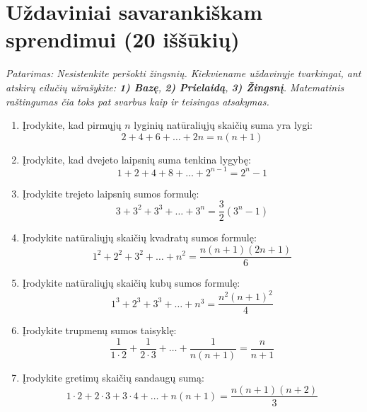 \documentclass[11pt,a4paper]{scrartcl}
\begin{document}
\section{Uždaviniai savarankiškam sprendimui (20 iššūkių)}

\textit{Patarimas: Nesistenkite peršokti žingsnių. Kiekviename uždavinyje tvarkingai, ant atskirų eilučių užrašykite: \textbf{1) Bazę}, \textbf{2) Prielaidą}, \textbf{3) Žingsnį}. Matematinis raštingumas čia toks pat svarbus kaip ir teisingas atsakymas.}

\begin{enumerate}
    \item Įrodykite, kad pirmųjų $n$ lyginių natūraliųjų skaičių suma yra lygi:
    $$ 2 + 4 + 6 + \dots + 2n = n(n+1) $$
    
    \item Įrodykite, kad dvejeto laipsnių suma tenkina lygybę:
    $$ 1 + 2 + 4 + 8 + \dots + 2^{n-1} = 2^n - 1 $$
    
    \item Įrodykite trejeto laipsnių sumos formulę:
    $$ 3 + 3^2 + 3^3 + \dots + 3^n = \frac{3}{2}(3^n - 1) $$
    
    \item Įrodykite natūraliųjų skaičių kvadratų sumos formulę:
    $$ 1^2 + 2^2 + 3^2 + \dots + n^2 = \frac{n(n+1)(2n+1)}{6} $$
    
    \item Įrodykite natūraliųjų skaičių kubų sumos formulę:
    $$ 1^3 + 2^3 + 3^3 + \dots + n^3 = \frac{n^2(n+1)^2}{4} $$
    
    \item Įrodykite trupmenų sumos taisyklę:
    $$ \frac{1}{1\cdot 2} + \frac{1}{2\cdot 3} + \dots + \frac{1}{n(n+1)} = \frac{n}{n+1} $$
    
    \item Įrodykite gretimų skaičių sandaugų sumą:
    $$ 1\cdot 2 + 2\cdot 3 + 3\cdot 4 + \dots + n(n+1) = \frac{n(n+1)(n+2)}{3} $$
\end{enumerate}
\end{document}
